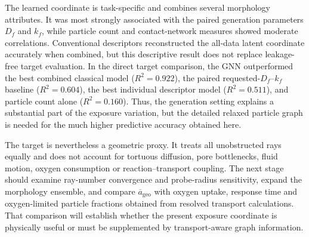\documentclass[12pt,a4paper]{article}
\begin{document}
The learned coordinate is task-specific and combines several morphology
attributes. It was most strongly associated with the paired generation
parameters $D_f$ and $k_f$, while particle count and contact-network measures
showed moderate correlations. Conventional descriptors reconstructed the
all-data latent coordinate accurately when combined, but this descriptive
result does not replace leakage-free target evaluation. In the direct target
comparison, the GNN outperformed the best combined classical model
($R^2=0.922$), the paired requested-$D_f$--$k_f$ baseline ($R^2=0.604$), the
best individual descriptor model ($R^2=0.511$), and particle count alone
($R^2=0.160$). Thus, the generation setting explains a substantial part of the
exposure variation, but the detailed relaxed particle graph is needed for the
much higher predictive accuracy obtained here.

The target is nevertheless a geometric proxy. It treats all unobstructed rays
equally and does not account for tortuous diffusion, pore bottlenecks, fluid
motion, oxygen consumption or reaction--transport coupling. The next stage
should examine ray-number convergence and probe-radius sensitivity, expand the
morphology ensemble, and compare $\overline a_{\mathrm{geo}}$ with oxygen
uptake, response time and oxygen-limited particle fractions obtained from
resolved transport calculations. That comparison will establish whether the
present exposure coordinate is physically useful or must be supplemented by
transport-aware graph information.

\printbibliography
\end{document}
